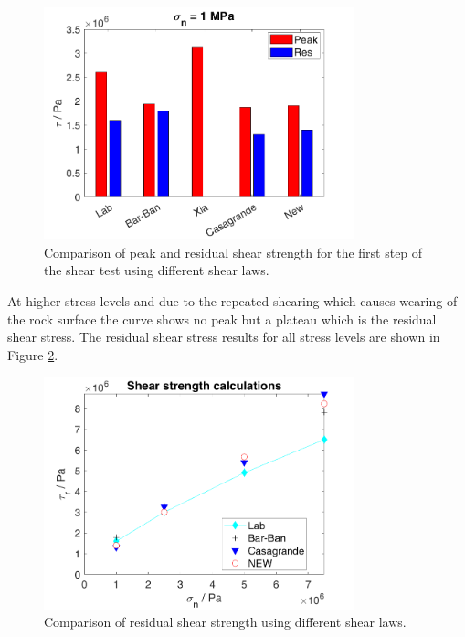 \begin{figure}[!ht]
\begin{center}
\includegraphics[width=0.8\textwidth]{./figures/MEX7_Comparison_final_Peak_Res_value_ME1.png}
\caption{Comparison of peak and residual shear strength for the first step of the shear test using different shear laws.}
\label{fig:MEX7_Comparison_final_ME1_Peak}
\end{center}
\end{figure}

At higher stress levels and due to the repeated shearing which causes wearing of the rock surface the curve shows no peak but a plateau which is the residual shear stress. The residual shear stress results for all stress levels are shown in Figure \ref{fig:MEX7_Comparison_final_ME1_Res}.

\begin{figure}[!ht]
\begin{center}
\includegraphics[width=0.8\textwidth]{./figures/MEX7_Comparison_final_res.png}
\caption{Comparison of residual shear strength using different shear laws.}
\label{fig:MEX7_Comparison_final_ME1_Res}
\end{center}
\end{figure}

